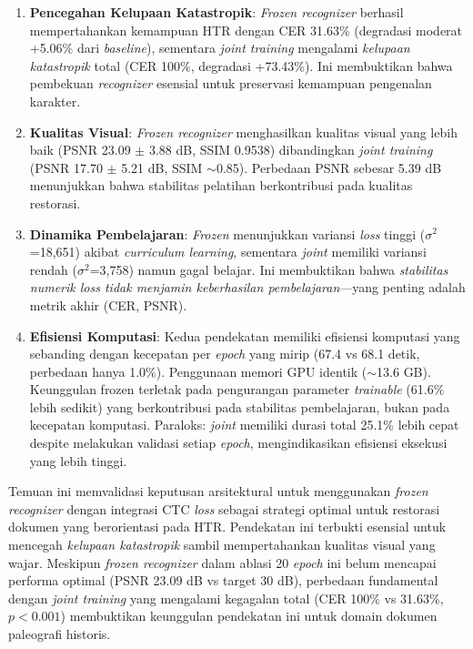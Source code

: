 \documentclass[12pt,a4paper]{article}
\begin{document}
\begin{enumerate}[label=\arabic*., leftmargin=0.5cm]
    \item \textbf{Pencegahan Kelupaan Katastropik}: \textit{Frozen recognizer} berhasil mempertahankan kemampuan HTR dengan CER 31.63\% (degradasi moderat +5.06\% dari \textit{baseline}), sementara \textit{joint training} mengalami \textit{kelupaan katastropik} total (CER 100\%, degradasi +73.43\%). Ini membuktikan bahwa pembekuan \textit{recognizer} esensial untuk preservasi kemampuan pengenalan karakter.
    
    \item \textbf{Kualitas Visual}: \textit{Frozen recognizer} menghasilkan kualitas visual yang lebih baik (PSNR 23.09 $\pm$ 3.88 dB, SSIM 0.9538) dibandingkan \textit{joint training} (PSNR 17.70 $\pm$ 5.21 dB, SSIM $\sim$0.85). Perbedaan PSNR sebesar 5.39 dB menunjukkan bahwa stabilitas pelatihan berkontribusi pada kualitas restorasi.
    
    \item \textbf{Dinamika Pembelajaran}: \textit{Frozen} menunjukkan variansi \textit{loss} tinggi ($\sigma^2$=18,651) akibat \textit{curriculum learning}, sementara \textit{joint} memiliki variansi rendah ($\sigma^2$=3,758) namun gagal belajar. Ini membuktikan bahwa \textit{stabilitas numerik \textit{loss} tidak menjamin keberhasilan pembelajaran}—yang penting adalah metrik akhir (CER, PSNR).
    
    \item \textbf{Efisiensi Komputasi}: Kedua pendekatan memiliki efisiensi komputasi yang sebanding dengan kecepatan per \textit{epoch} yang mirip (67.4 vs 68.1 detik, perbedaan hanya 1.0\%). Penggunaan memori GPU identik ($\sim$13.6 GB). Keunggulan frozen terletak pada pengurangan parameter \textit{trainable} (61.6\% lebih sedikit) yang berkontribusi pada stabilitas pembelajaran, bukan pada kecepatan komputasi. Paraloks: \textit{joint} memiliki durasi total 25.1\% lebih cepat despite melakukan validasi setiap \textit{epoch}, mengindikasikan efisiensi eksekusi yang lebih tinggi.
\end{enumerate}

Temuan ini memvalidasi keputusan arsitektural untuk menggunakan \textit{frozen recognizer} dengan integrasi CTC \textit{loss} sebagai strategi optimal untuk restorasi dokumen yang berorientasi pada HTR. Pendekatan ini terbukti esensial untuk mencegah \textit{kelupaan katastropik} sambil mempertahankan kualitas visual yang wajar. Meskipun \textit{frozen recognizer} dalam ablasi 20 \textit{epoch} ini belum mencapai performa optimal (PSNR 23.09 dB vs target 30 dB), perbedaan fundamental dengan \textit{joint training} yang mengalami kegagalan total (CER 100\% vs 31.63\%, $p<0.001$) membuktikan keunggulan pendekatan ini untuk domain dokumen paleografi historis.
\end{document}
